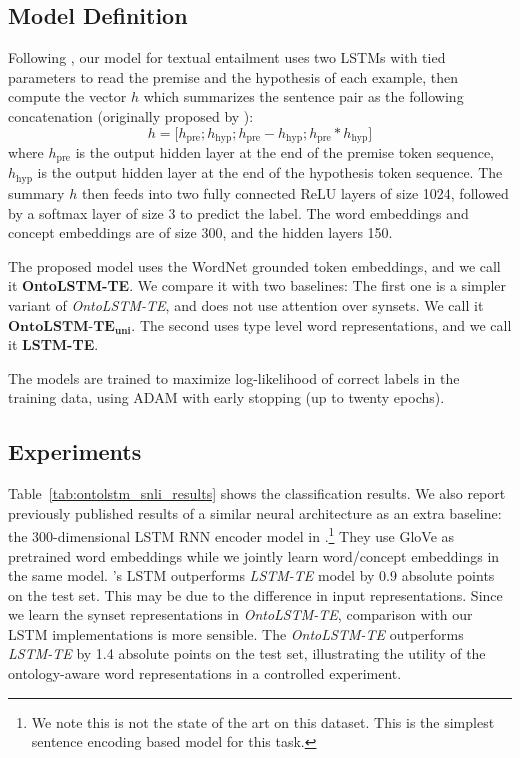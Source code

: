 \subsection{Model Definition}
Following \cite{bowman2016fast}, our model for textual entailment uses two LSTMs with tied parameters
to  read the premise and the hypothesis of each example, then compute the vector $h$ 
which summarizes the sentence pair as the following concatenation (originally proposed by \cite{mou2015recognizing}):
$$h=\big[h_{\text{pre}}; h_{\text{hyp}}; h_{\text{pre}} 
-h_{\text{hyp}};h_{\text{pre}} *h_{\text{hyp}}\big]$$
where $h_\text{pre}$ is the output hidden layer at the end of the premise token 
sequence, $h_\text{hyp}$ is the output hidden layer at the end of the hypothesis 
token sequence.
The summary $h$ then feeds into two fully connected ReLU layers of size 1024, 
followed by a softmax layer of size 3 to predict the label.
The word embeddings and concept embeddings are of size 300, and the hidden 
layers 150.

The proposed model uses the WordNet grounded token embeddings, and we call it \textbf{OntoLSTM-TE}.
We compare it with two baselines: The first one is a simpler variant of \textit{OntoLSTM-TE}, and does not
use attention over synsets. We call it $\textbf{OntoLSTM-TE}_{\textbf{uni}}$. The second uses type level word representations, and 
we call it \textbf{LSTM-TE}.

The models are trained to maximize log-likelihood of correct labels in the 
training data, using ADAM \citep{kingma2014adam} with early stopping (up to 
twenty epochs).

\subsection{Experiments}
Table~\ref{tab:ontolstm_snli_results} shows the classification results. We also 
report previously published results of a similar neural architecture as an extra 
baseline: the 300-dimensional LSTM RNN encoder model in 
\cite{bowman2016fast}.\footnote{We note this is not the state of the art
on this dataset. This is the simplest sentence encoding based model for this task.}
They use GloVe as pretrained word embeddings while we jointly learn word/concept 
embeddings in the same model.
\cite{bowman2016fast}'s LSTM outperforms \textit{LSTM-TE} model by 0.9 absolute points 
on the test set. This may be due to the difference in input representations. 
Since we learn the synset representations in \textit{OntoLSTM-TE}, comparison with our LSTM 
implementations is more sensible.
The \textit{OntoLSTM-TE} outperforms \textit{LSTM-TE} by 1.4 absolute 
points on the test set, illustrating the utility of the ontology-aware word 
representations in a controlled experiment.

